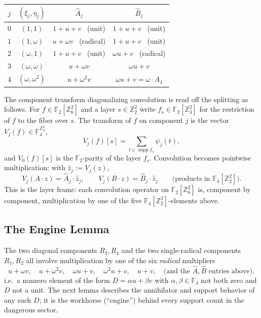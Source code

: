 \documentclass[11pt]{article}
\newcommand{\Z}{\mathbb{Z}}
\newcommand{\F}[1]{\mathbb{F}_{#1}}
\DeclareMathOperator{\supp}{supp}
\newcommand{\hA}{\hat{A}}
\newcommand{\hB}{\hat{B}}
\theoremstyle{plain}
\theoremstyle{definition}
\theoremstyle{remark}
\begin{document}
\begin{center}
\begin{tabular}{cccc}
\toprule
$j$ & $(\xi_j,\eta_j)$ & $\hA_j$ & $\hB_j$ \\
\midrule
$0$ & $(1,1)$        & $1+u+v$ \ (unit)   & $1+u+v$ \ (unit) \\
$1$ & $(1,\omega)$   & $u+\omega v$ \ (radical) & $1+u+v$ \ (unit) \\
$2$ & $(\omega,1)$   & $1+u+v$ \ (unit)   & $\omega u+v$ \ (radical) \\
$3$ & $(\omega,\omega)$  & $u+\omega v$   & $\omega u+v$ \\
$4$ & $(\omega,\omega^2)$ & $u+\omega^2 v$ & $\omega u+v=\omega\cdot\hA_4$ \\
\bottomrule
\end{tabular}
\end{center}

\noindent
The component transform diagonalizing convolution is read off the splitting as
follows. For $f\in\F2[\Z_6^2]$ and a layer $s\in\Z_2^2$ write $f_s\in\F2[\Z_3^2]$
for the restriction of $f$ to the fiber over $s$. The transform of $f$ on
component $j$ is the vector $V_j(f)\in\F4^{\Z_2^2}$,
\[
  V_j(f)[s]=\sum_{t\in\supp f_s}\psi_j(t),
\]
and $V_0(f)[s]$ is the $\F2$-parity of the layer $f_s$. Convolution becomes
pointwise multiplication: with $\widehat{z}_j:=V_j(z)$,
\begin{equation}\label{eq:crt-mtable}
  V_j(A\cdot z)=\hA_j\cdot\widehat{z}_j,\qquad
  V_j(B\cdot z)=\hB_j\cdot\widehat{z}_j
  \qquad\text{(products in }\F4[\Z_2^2]\text{)}.
\end{equation}
This is the layer frame: each convolution operator on $\F2[\Z_6^2]$ is, component
by component, multiplication by one of the five $\F4[\Z_2^2]$-elements above.

\subsection{The Engine Lemma}

The two diagonal components $R_3,R_4$ and the two single-radical components
$R_1,R_2$ all involve multiplication by one of the six \emph{radical}
multipliers
\[
  u+\omega v,\quad u+\omega^2 v,\quad \omega u+v,\quad
  \omega^2 u+v,\quad u+v,\quad \text{(and the } \hA,\hB \text{ entries above)},
\]
i.e.\ a nonzero element of the form $D=\alpha u+\beta v$ with $\alpha,\beta\in\F4$
not both zero and $D$ not a unit. The next lemma describes the annihilator and
support behavior of any such $D$; it is the workhorse (``engine'') behind every
support count in the dangerous sector.
\end{document}
